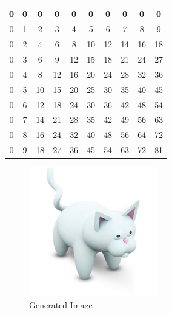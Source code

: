 \documentclass{article}
\begin{document}
\begin{tabular}{|c|c|c|c|c|c|c|c|c|c|}
	\hline
	0 & 0 & 0 & 0 & 0 & 0 & 0 & 0 & 0 & 0 \\
	\hline
	0 & 1 & 2 & 3 & 4 & 5 & 6 & 7 & 8 & 9 \\
	\hline
	0 & 2 & 4 & 6 & 8 & 10 & 12 & 14 & 16 & 18 \\
	\hline
	0 & 3 & 6 & 9 & 12 & 15 & 18 & 21 & 24 & 27 \\
	\hline
	0 & 4 & 8 & 12 & 16 & 20 & 24 & 28 & 32 & 36 \\
	\hline
	0 & 5 & 10 & 15 & 20 & 25 & 30 & 35 & 40 & 45 \\
	\hline
	0 & 6 & 12 & 18 & 24 & 30 & 36 & 42 & 48 & 54 \\
	\hline
	0 & 7 & 14 & 21 & 28 & 35 & 42 & 49 & 56 & 63 \\
	\hline
	0 & 8 & 16 & 24 & 32 & 40 & 48 & 56 & 64 & 72 \\
	\hline
	0 & 9 & 18 & 27 & 36 & 45 & 54 & 63 & 72 & 81 \\
	\hline
\end{tabular}

\begin{figure}[h]
	\centering
	\includegraphics[width=0.5\textwidth]{cat.png}
	\caption{Generated Image}
	\label{fig:image}
\end{figure}
\end{document}

